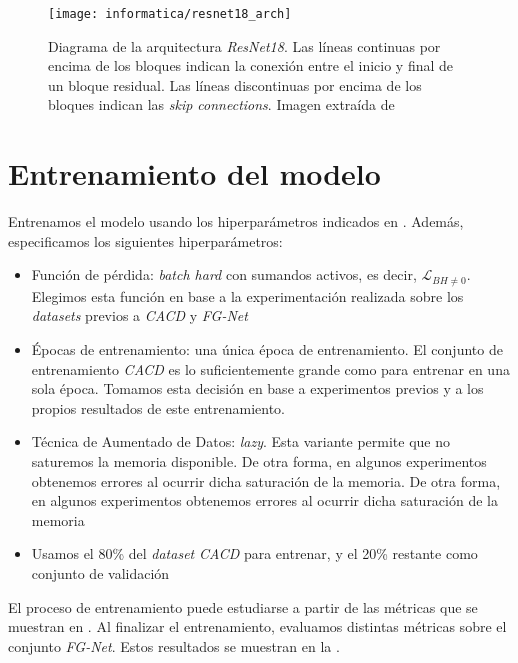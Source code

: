 \begin{figure}[!hbt]
    \centering
    \texttt{[image: informatica/resnet18\_arch]}
    \caption{Diagrama de la arquitectura \textit{ResNet18}. Las líneas continuas por encima de los bloques indican la conexión entre el inicio y final de un bloque residual. Las líneas discontinuas por encima de los bloques indican las \textit{skip connections}. Imagen extraída de \cite{informatica:resnet18_arch_web}}
    \label{img:arquitectura_resnet_18}
\end{figure}

\section{Entrenamiento del modelo} \label{isec:entrenamiento_mejor_modelo}

Entrenamos el modelo usando los hiperparámetros indicados en . Además, especificamos los siguientes hiperparámetros:

\begin{itemize}
    \item Función de pérdida: \textit{batch hard} con sumandos activos, es decir, $\mathcal{L}_{BH \neq 0}$. Elegimos esta función en base a la experimentación realizada sobre los \textit{datasets} previos a \textit{CACD} y \textit{FG-Net}
    \item Épocas de entrenamiento: una única época de entrenamiento. El conjunto de entrenamiento \textit{CACD} es lo suficientemente grande como para entrenar en una sola época. Tomamos esta decisión en base a experimentos previos y a los propios resultados de este entrenamiento.
    \item Técnica de Aumentado de Datos: \textit{lazy}. Esta variante permite que no saturemos la memoria disponible. De otra forma, en algunos experimentos obtenemos errores al ocurrir dicha saturación de la memoria. De otra forma, en algunos experimentos obtenemos errores al ocurrir dicha saturación de la memoria
    \item Usamos el 80\% del \textit{dataset} \textit{CACD} para entrenar, y el 20\% restante como conjunto de validación
\end{itemize}

El proceso de entrenamiento puede estudiarse a partir de las métricas que se muestran en . Al finalizar el entrenamiento, evaluamos distintas métricas sobre el conjunto \textit{FG-Net}. Estos resultados se muestran en la .

